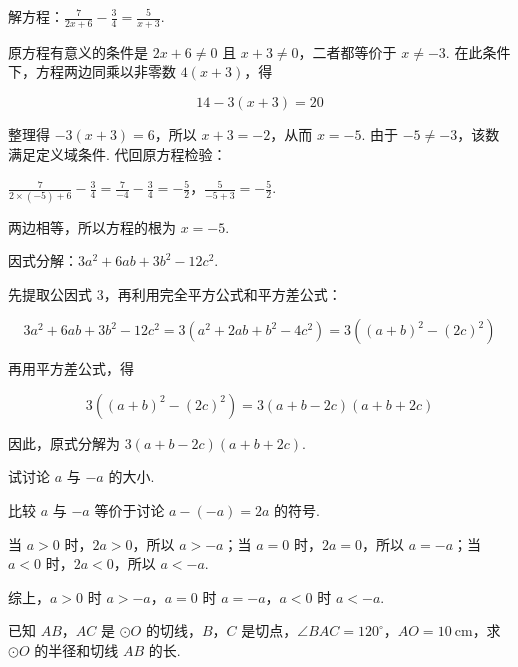 \begin{problem}
解方程：\( \frac{7}{2x+6}-\frac{3}{4}=\frac{5}{x+3} \).
\end{problem}

\begin{solution}
原方程有意义的条件是 \(2x+6\ne0\) 且 \(x+3\ne0\)，二者都等价于 \(x\ne-3\). 在此条件下，方程两边同乘以非零数 \(4\left(x+3\right)\)，得

\[
14-3\left(x+3\right)=20
\]

整理得 \(-3\left(x+3\right)=6\)，所以 \(x+3=-2\)，从而 \(x=-5\). 由于 \(-5\ne-3\)，该数满足定义域条件. 代回原方程检验：

\(\frac{7}{2\times(-5)+6}-\frac{3}{4} =\frac{7}{-4}-\frac{3}{4}=-\frac{5}{2}\)，\(\frac{5}{-5+3}=-\frac{5}{2}\).

两边相等，所以方程的根为 \(x=-5\).
\end{solution}

\begin{problem}
因式分解：\( 3a^2+6ab+3b^2-12c^2 \).
\end{problem}

\begin{solution}
先提取公因式 \(3\)，再利用完全平方公式和平方差公式：

\[
3a^2+6ab+3b^2-12c^2
=3\left(a^2+2ab+b^2-4c^2\right)
=3\left(\left(a+b\right)^2-(2c)^2\right)
\]

再用平方差公式，得

\[
3\left(\left(a+b\right)^2-(2c)^2\right)
=3\left(a+b-2c\right)\left(a+b+2c\right)
\]

因此，原式分解为 \(3\left(a+b-2c\right)\left(a+b+2c\right)\).
\end{solution}

\begin{problem}
试讨论 \(a\) 与 \(-a\) 的大小.
\end{problem}

\begin{solution}
比较 \(a\) 与 \(-a\) 等价于讨论 \(a-(-a)=2a\) 的符号.

当 \(a>0\) 时，\(2a>0\)，所以 \(a>-a\)；当 \(a=0\) 时，\(2a=0\)，所以 \(a=-a\)；当 \(a<0\) 时，\(2a<0\)，所以 \(a<-a\).

综上，\(a>0\) 时 \(a>-a\)，\(a=0\) 时 \(a=-a\)，\(a<0\) 时 \(a<-a\).
\end{solution}

\begin{problem}
已知 \(AB\)，\(AC\) 是 \(\odot O\) 的切线，\(B\)，\(C\) 是切点，\(\angle BAC=120^\circ\)，\(AO=10\mathrm{~cm}\)，求 \(\odot O\) 的半径和切线 \(AB\) 的长.
\end{problem}

